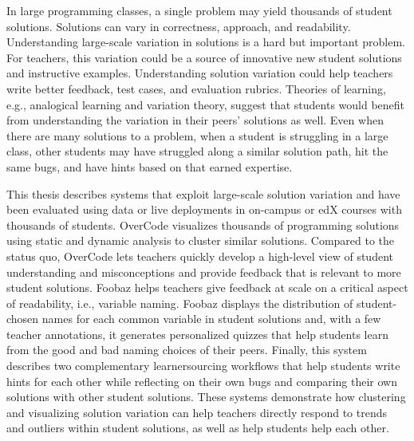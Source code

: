 \cleardoublepage
\pagestyle{empty}
\setcounter{savepage}{\thepage}
\begin{abstractpage}
In large programming classes, a single problem may yield thousands of student solutions. Solutions can vary in correctness, approach, and readability. Understanding large-scale variation in solutions is a hard but important problem. For teachers, this variation could be a source of innovative new student solutions and instructive examples. Understanding solution variation could help teachers write better feedback, test cases, and evaluation rubrics. Theories of learning, e.g., analogical learning and variation theory, suggest that students would benefit from understanding the variation in their peers' solutions as well. Even when there are many solutions to a problem, when a student is struggling in a large class, other students may have struggled along a similar solution path, hit the same bugs, and have hints based on that earned expertise.

This thesis describes systems that exploit large-scale solution variation and have been evaluated using data or live deployments in on-campus or edX courses with thousands of students. OverCode visualizes thousands of programming solutions using static and dynamic analysis to cluster similar solutions. Compared to the status quo, OverCode lets teachers quickly develop a high-level view of student understanding and misconceptions and provide feedback that is relevant to more student solutions. Foobaz helps teachers give feedback at scale on a critical aspect of readability, i.e., variable naming. Foobaz displays the distribution of student-chosen names for each common variable in student solutions and, with a few teacher annotations, it generates personalized quizzes that help students learn from the good and bad naming choices of their peers. Finally, this system describes two complementary learnersourcing workflows that help students write hints for each other while reflecting on their own bugs and comparing their own solutions with other student solutions. These systems demonstrate how clustering and visualizing solution variation can help teachers directly respond to trends and outliers within student solutions, as well as help students help each other.
\end{abstractpage}


